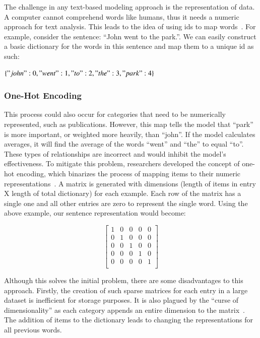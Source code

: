 The challenge in any text-based modeling approach is the representation of data. A computer cannot comprehend words like humans, thus it needs a numeric approach for text analysis. This leads to the idea of using ids to map words~\parencite{nlpfundamentals}. For example, consider the sentence: “John went to the park.”. We can easily construct a basic dictionary for the words in this sentence and map them to a unique id as such: 

$\{"john" : 0, "went" : 1, "to" : 2, "the" : 3, "park" : 4\}$

\subsubsection{One-Hot Encoding}
This process could also occur for categories that need to be numerically represented, such as publications. However, this map tells the model that “park” is more important, or weighted more heavily, than “john”. If the model calculates averages, it will find the average of the words “went” and “the” to equal “to”. These types of relationships are incorrect and would inhibit the model’s effectiveness. To mitigate this problem, researchers developed the concept of one-hot encoding, which binarizes the process of mapping items to their numeric representations~\parencite{harris_harris_2015}. A matrix is generated with dimensions (length of items in entry X length of total dictionary) for each example. Each row of the matrix has a single one and all other entries are zero to represent the single word. Using the above example, our sentence representation would become:

\[\begin{bmatrix}
1 & 0 & 0 & 0 & 0\\
0 & 1 & 0 & 0 & 0\\
0 & 0 & 1 & 0 & 0\\
0 & 0 & 0 & 1 & 0\\
0 & 0 & 0 & 0 & 1\\
\end{bmatrix}\]

Although this solves the initial problem, there are some disadvantages to this approach. Firstly, the creation of such sparse matrices for each entry in a large dataset is inefficient for storage purposes. It is also plagued by the “curse of dimensionality” as each category appends an entire dimension to the matrix~\parencite{bellman_1954}. The addition of items to the dictionary leads to changing the representations for all previous words. 

